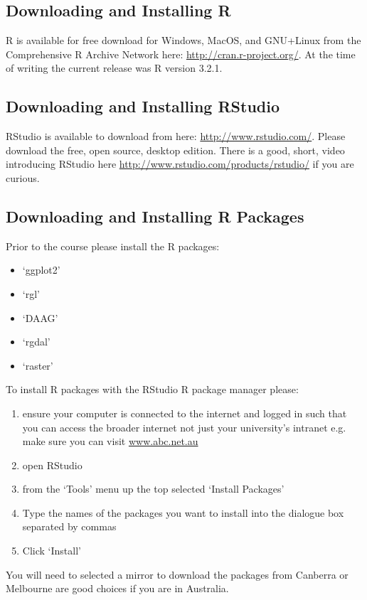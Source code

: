 \documentclass{article}[12pt]
\begin{document}
\subsection*{Downloading and Installing R}
R is available for free download for Windows, MacOS, and GNU+Linux from the Comprehensive R Archive Network here: \url{http://cran.r-project.org/}.  At the time of writing the current release was R version 3.2.1.

\subsection*{Downloading and Installing RStudio}
RStudio is available to download from here: \url{http://www.rstudio.com/}.
Please download the free, open source, desktop edition.
There is a good, short, video introducing RStudio here \url{http://www.rstudio.com/products/rstudio/} if you are curious.

\subsection*{Downloading and Installing R Packages}
Prior to the course please install the R packages: \begin{itemize}
 \item `ggplot2'
 \item `rgl'
 \item `DAAG'
 \item `rgdal'
 \item `raster'
\end{itemize}

To install R packages with the RStudio R package manager please: \begin{enumerate}
\item ensure your computer is connected to the internet and logged in such that you can access the broader internet not just your university's intranet e.g. make sure you can visit \url{www.abc.net.au}
\item open RStudio
\item from the `Tools' menu up the top selected `Install Packages'
\item Type the names of the packages you want to install into the dialogue box separated by commas
\item Click `Install'
\end{enumerate}
You will need to selected a mirror to download the packages from Canberra or Melbourne are good choices if you are in Australia.
\end{document}
